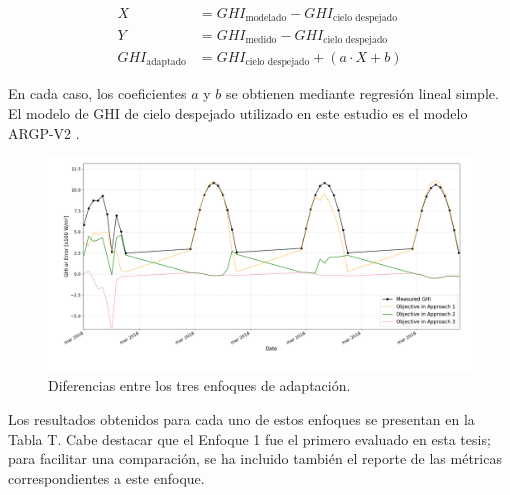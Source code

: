 \begin{align}
X &= GHI_{\text{modelado}} - GHI_{\text{cielo despejado}} \\
Y &= GHI_{\text{medido}} - GHI_{\text{cielo despejado}} \\
GHI_{\text{adaptado}} &= GHI_{\text{cielo despejado}} + (a \cdot X + b)
\label{eq:approach3}
\end{align}

En cada caso, los coeficientes $a$ y $b$ se obtienen mediante regresión lineal simple. El modelo de GHI de cielo despejado utilizado en este estudio es el modelo ARGP-V2 \cite{Ledesma2023a}.

\begin{figure}[ht!]
\centering
\includegraphics[width=\textwidth]{figuras/approaches.png}
\caption{Diferencias entre los tres enfoques de adaptación.}
\label{fig:approaches}
\end{figure}



Los resultados obtenidos para cada uno de estos enfoques se presentan en la Tabla T. Cabe destacar que el Enfoque 1 fue el primero evaluado en esta tesis; para facilitar una comparación, se ha incluido también el reporte de las métricas correspondientes a este enfoque.




